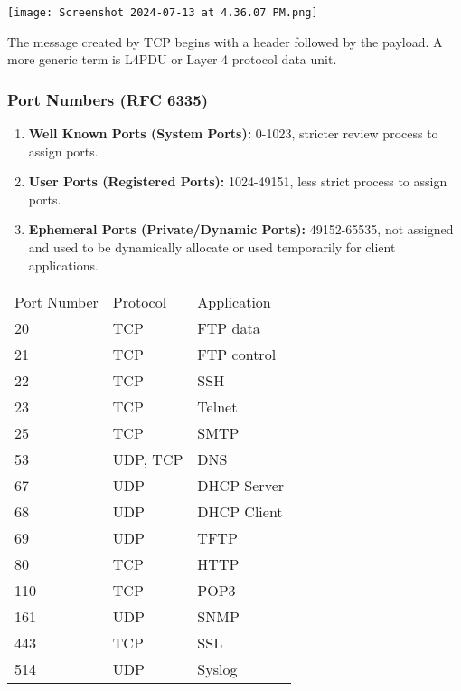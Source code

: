\documentclass[a4paper]{article}
\begin{document}
    \texttt{[image: Screenshot 2024-07-13 at 4.36.07 PM.png]}

    The message created by TCP begins with a header followed by the payload. A more generic term is L4PDU or Layer 4 protocol data unit. 
    \subsubsection{Port Numbers (RFC 6335)}
    \begin{enumerate}
        \item \textbf{Well Known Ports (System Ports): } 0-1023, stricter review process to assign ports. 
        \item \textbf{User Ports (Registered Ports): } 1024-49151, less strict process to assign ports. 
        \item \textbf{Ephemeral Ports (Private/Dynamic Ports): } 49152-65535, not assigned and used to be dynamically allocate or used temporarily for client applications. 
    \end{enumerate}

    \begin{table}[H]
        \begin{tabular}{|l|l|l|}
        \cline{1-3}
        Port Number & Protocol & Application \\ \cline{1-3}
        20          & TCP      & FTP data    \\ \cline{1-3}
        21          & TCP      & FTP control \\ \cline{1-3}
        22          & TCP      & SSH \\  \cline{1-3}
        23          & TCP      & Telnet \\ \cline{1-3}
        25          & TCP      & SMTP \\ \cline{1-3}
        53          & UDP, TCP & DNS \\ \cline{1-3}
        67          & UDP      & DHCP Server \\ \cline{1-3}
        68          & UDP      & DHCP Client \\ \cline{1-3}
        69          & UDP      & TFTP \\ \cline{1-3} 
        80          & TCP      & HTTP \\ \cline{1-3} 
        110         & TCP      & POP3 \\ \cline{1-3}
        161         & UDP      & SNMP \\ \cline{1-3}
        443         & TCP      & SSL \\ \cline{1-3}
        514         & UDP      & Syslog \\ \cline{1-3}
        \cline{1-3}
        \end{tabular}
    \end{table}
\end{document}
